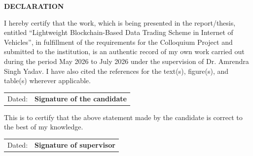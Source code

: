 
\begin{center}
{\Large \bf DECLARATION}
\end{center}

\vspace{0.5cm}

\noindent
I hereby certify that the work, which is being presented in the report/thesis, entitled ``Lightweight Blockchain-Based Data Trading Scheme in Internet of Vehicles'', in fulfillment of the requirements for the Colloquium Project and submitted to the institution, is an authentic record of my own work carried out during the period May 2026 to July 2026 under the supervision of Dr. Amrendra Singh Yadav. I have also cited the references for the text(s), figure(s), and table(s) wherever applicable.

\vspace{1cm}

\begin{center}
	\begin{tabular}{@{}p{}p{}@{}}
		Dated:  & {\bf{Signature of the candidate}}  
	\end{tabular}
\end{center}

\vspace{1.5cm}

\noindent
This is to certify that the above statement made by the candidate is correct to the best of my knowledge.

\vspace{1.5cm}

\begin{center}
	\begin{tabular}{@{}p{}p{}@{}}
		Dated: & {\bf{Signature of supervisor}} 
	\end{tabular}
\end{center}

